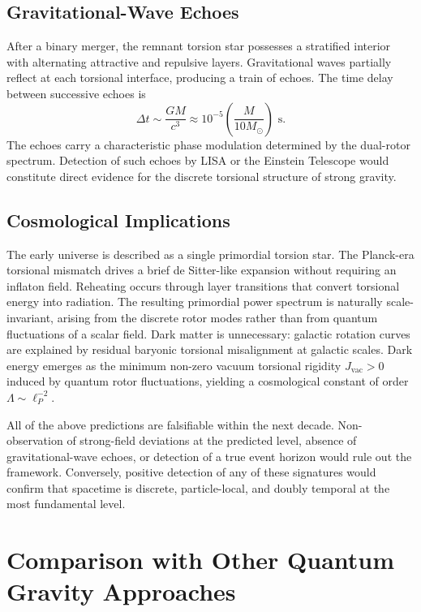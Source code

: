 \documentclass[dvipdfmx,11pt,a4paper]{article}
\begin{document}
\subsection{Gravitational-Wave Echoes}

After a binary merger, the remnant torsion star possesses a stratified interior with alternating attractive and repulsive layers. Gravitational waves partially reflect at each torsional interface, producing a train of echoes. The time delay between successive echoes is
\[
\Delta t \sim \frac{GM}{c^3} \approx 10^{-5} \left( \frac{M}{10 M_\odot} \right) \text{ s}.
\]
The echoes carry a characteristic phase modulation determined by the dual-rotor spectrum. Detection of such echoes by LISA or the Einstein Telescope would constitute direct evidence for the discrete torsional structure of strong gravity.

\subsection{Cosmological Implications}

The early universe is described as a single primordial torsion star. The Planck-era torsional mismatch drives a brief de Sitter-like expansion without requiring an inflaton field. Reheating occurs through layer transitions that convert torsional energy into radiation. The resulting primordial power spectrum is naturally scale-invariant, arising from the discrete rotor modes rather than from quantum fluctuations of a scalar field. Dark matter is unnecessary: galactic rotation curves are explained by residual baryonic torsional misalignment at galactic scales. Dark energy emerges as the minimum non-zero vacuum torsional rigidity $J_\text{vac} > 0$ induced by quantum rotor fluctuations, yielding a cosmological constant of order $\Lambda \sim \ell_P^{-2}$.

All of the above predictions are falsifiable within the next decade. Non-observation of strong-field deviations at the predicted level, absence of gravitational-wave echoes, or detection of a true event horizon would rule out the framework. Conversely, positive detection of any of these signatures would confirm that spacetime is discrete, particle-local, and doubly temporal at the most fundamental level.

\section{Comparison with Other Quantum Gravity Approaches}
\label{sec:comparison}
\end{document}
